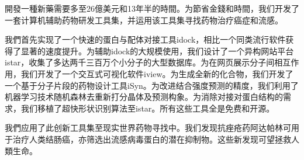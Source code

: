 開發一種新藥需要多至26億美元和13年半的時間。为節省金錢和時間，我们开发了一套计算机辅助药物研发工具集，并运用该工具集寻找药物治疗癌症和流感。

我們首先实现了一个快速的蛋白与配体对接工具idock，相比一个同类流行软件获得了显著的速度提升。为辅助idock的大规模使用，我们设计了一个异构网站平台istar，收集了多达两千三百万个小分子的大型数据库。为在网页展示分子间相互作用，我们开发了一个交互式可视化软件iview。为生成全新的化合物，我们开发了一个基于分子片段的药物设计工具iSyn。为改进结合强度预测的精度，我们利用了机器学习技术随机森林去重新打分晶体及预测构象。为消除对接对蛋白结构的需求，我们移植了超快形状识别算法至istar。所有这些工具全是免费和开源。

我們应用了此创新工具集至现实世界药物寻找中。我们发现抗痤疮药阿达帕林可用于治疗人类结肠癌，亦筛选出流感病毒蛋白的潜在抑制物。这些新发现可望拯救人類生命。

